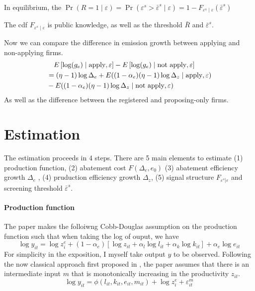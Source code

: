\documentclass[12pt]{article}[margin=1in]
\begin{document}
In equilibrium, the $\Pr(R=1\mid\varepsilon) = \Pr(\varepsilon^s>\bar{\varepsilon}^s\mid \varepsilon) = 1-F_{\varepsilon^s\mid \varepsilon}(\bar{\varepsilon}^s)$

The cdf $F_{\varepsilon^s\mid \varepsilon}$ is public knowledge, as well as the threshold $\bar{R}$ and $\bar{\varepsilon}^s$.

Now we can compare the difference in emission growth between applying and non-applying firms.
\begin{equation*}
    \begin{split}
         & \quad E\left[\log(g_e)\mid \text{apply},\varepsilon\right] - E\left[\log(g_e)\mid \text{not apply},\varepsilon\right] \\
         & =  (\eta - 1)\log \Delta_e + E((1 - \alpha_e)(\eta - 1)\log \Delta_z \mid \text{apply},\varepsilon)     \\
         & - E((1 - \alpha_e)(\eta - 1)\log \Delta_z \mid \text{not apply},\varepsilon)                            \\
    \end{split}
\end{equation*}
As well as the difference between the registered and proposing-only firms.
\section{Estimation}
The estimation proceeds in 4 steps. There are 5 main elements to estimate (1) production function, (2) abatement cost $F(\Delta_e,e_0)$ (3) abatement efficiency growth $\Delta_e$ , (4) pruduction efficiency growth $\Delta_z$, (5) signal structure $F_{\varepsilon^s|\varepsilon}$ and screening threshold $\bar{\varepsilon}^s$.

\paragraph{Production function}
The paper makes the folloiwng Cobb-Douglas assumption on the production function such that when taking the log of ouput, we have
\begin{equation}
    \log y_{it} = \log z_i^e + (1 - \alpha_e)[\log z_{it} + \alpha_l \log l_{it} + \alpha_k \log k_{it}] + \alpha_e \log e_{it}
\end{equation}
For simplicity in the exposition, I myself take output $y$ to be observed. Following the now classical approach first proposed in \citet{ackerberg2015identification}, the paper assumes that there is an intermediate input $m$ that is monotonically increasing in the productivity $z_{it}$.
$$\log y_{it} = \phi(l_{it}, k_{it}, e_{it}, m_{it}) + \log z_i^{e} + \varepsilon_{it}^m$$
\end{document}
